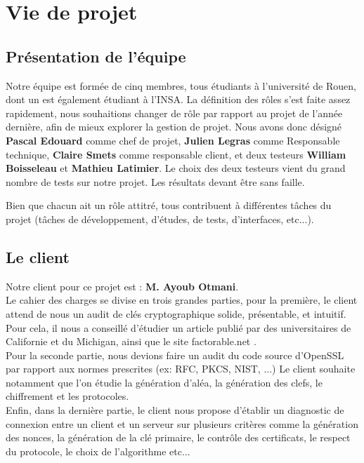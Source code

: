\chapter{Vie de projet}
\section{Présentation de l'équipe}

Notre équipe est formée de cinq membres, tous étudiants à l'université de Rouen, dont un est également étudiant à l'INSA.
La définition des rôles s'est faite assez rapidement, nous souhaitions changer de rôle par rapport au projet de l'année dernière, afin de mieux explorer la gestion de projet.
Nous avons donc désigné \textbf{Pascal Edouard} comme chef de projet, \textbf{Julien Legras} comme Responsable technique, \textbf{Claire Smets} comme responsable client, et deux testeurs \textbf{William Boisseleau} et \textbf{Mathieu Latimier}.
Le choix des deux testeurs vient du grand nombre de tests sur notre projet. Les résultats devant être sans faille.

Bien que chacun ait un rôle attitré, tous contribuent à différentes tâches du projet (tâches de développement, d'études, de tests, d'interfaces, etc...).

\section{Le client}

Notre client pour ce projet est : \textbf{M. Ayoub Otmani}.\\
Le cahier des charges se divise en trois grandes parties, pour la première, le client attend de nous un audit de clés cryptographique solide, présentable, et intuitif. Pour cela, il nous a conseillé d'étudier un article \cite{mining2012nadia} publié par des universitaires de Californie et du Michigan, ainsi que le site factorable.net \cite{factorable}.\\

Pour la seconde partie, nous devions faire un audit du code source d'OpenSSL par rapport aux normes prescrites (ex: RFC, PKCS, NIST, ...)
Le client souhaite notamment que l'on étudie la génération d'aléa, la génération des clefs, le chiffrement et les protocoles.\\

Enfin, dans la dernière partie, le client nous propose d'établir un diagnostic de connexion entre un client et un serveur sur plusieurs critères comme la génération des nonces, la génération de la clé primaire, le contrôle des certificats, le respect du protocole, le choix de l'algorithme etc...\\

